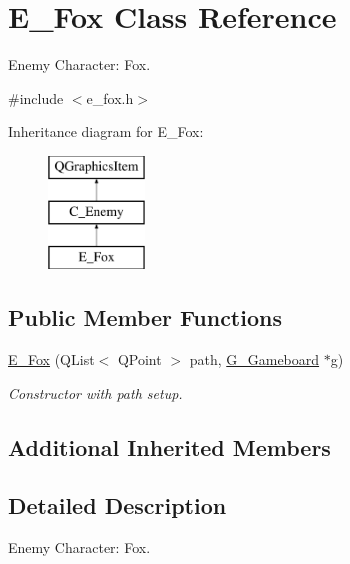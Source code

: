 \hypertarget{class_e___fox}{}\section{E\+\_\+\+Fox Class Reference}
\label{class_e___fox}


Enemy Character\+: Fox.  




{\ttfamily \#include $<$e\+\_\+fox.\+h$>$}

Inheritance diagram for E\+\_\+\+Fox\+:\begin{figure}[H]
\begin{center}
\leavevmode
\includegraphics[height=3.000000cm]{class_e___fox}
\end{center}
\end{figure}
\subsection*{Public Member Functions}
\begin{DoxyCompactItemize}
\item 
\hyperlink{class_e___fox_a0061d033174edc780c7af07d3062b31a}{E\+\_\+\+Fox} (Q\+List$<$ Q\+Point $>$ path, \hyperlink{class_g___gameboard}{G\+\_\+\+Gameboard} $\ast$g)
\begin{DoxyCompactList}\small\item\em Constructor with path setup. \end{DoxyCompactList}\end{DoxyCompactItemize}
\subsection*{Additional Inherited Members}


\subsection{Detailed Description}
Enemy Character\+: Fox. 

